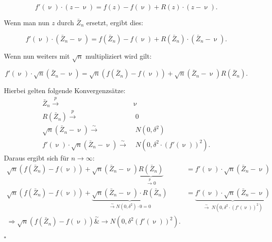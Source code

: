 \documentclass[10pt]{article}
\newcommand{\KW}{\overset{p} \longrightarrow} %
\newcommand{\KV}{\overset{\sim} \longrightarrow} %
\newenvironment{BWS}[1][]
{\begin{Beweis}[frametitle=#1]}{\end{Beweis}}
\begin{document}
\begin{BWS}[Beweis 1.3.1 Delta-Methode]
		\begin{equation*}
			f'(\upnu) \cdot (z-\upnu) = f(z) - f(\upnu) + R(z) \cdot (z-\upnu).
		\end{equation*}
		
		Wenn man nun $z$ durch $\bar{Z}_n$ ersetzt, ergibt dies:
		
		
		\begin{equation*}
			f'(\upnu) \cdot (\bar{Z}_n-\upnu) = f(\bar{Z}_n) - f(\upnu) + R(\bar{Z}_n) \cdot (\bar{Z}_n-\upnu).			
		\end{equation*}
		
		Wenn nun weiters mit $\sqrt{n}$ multipliziert wird gilt:
		
		\begin{equation*}
			f'(\upnu) \cdot\sqrt{n} (\bar{Z}_n-\upnu) = \sqrt{n}(f(\bar{Z}_n) - f(\upnu)) + \sqrt{n} (\bar{Z}_n-\upnu)	R(\bar{Z}_n).
		\end{equation*}
		
		Hierbei gelten folgende Konvergenzsätze:
		\begin{equation*}
			\begin{split}
			\bar{Z}_n \KW& \upnu\\
			R(\bar{Z}_n) \KW& \;0\\
			\sqrt{n} (\bar{Z}_n-\upnu) \KV& \;N(0,\delta^2)\\
			f'(\upnu) \cdot\sqrt{n} (\bar{Z}_n-\upnu) \KV& \;N(0,\delta^2 \cdot (f'(\upnu))^2).
			\end{split}
		\end{equation*}
		Daraus ergibt sich für $n \rightarrow \infty$: 
		\begin{equation*}
			\begin{split}
				\sqrt{n}(f(\bar{Z}_n) - f(\upnu)) + \sqrt{n} (\bar{Z}_n-\upnu)	\underbrace{R(\bar{Z}_n)}_{\overset{p}{\rightarrow} 0} &= f'(\upnu) \cdot\sqrt{n} (\bar{Z}_n-\upnu) \\
				\sqrt{n}(f(\bar{Z}_n) - f(\upnu)) + \underbrace{\sqrt{n} (\bar{Z}_n-\upnu) \cdot R(\bar{Z}_n)}_{\overset{\sim}{\rightarrow}N(0, \delta^2) \cdot 0 = 0} &= \underbrace{f'(\upnu) \cdot\sqrt{n} (\bar{Z}_n-\upnu)}_{\KV \;N(0,\delta^2 \cdot (f'(\upnu))^2)} \\
				\Longrightarrow \sqrt{n} (f(\bar{Z}_n) - f(\upnu)) \overset{\sim}&{\rightarrow} N(0, \delta^2 (f'(\upnu))^2).
			\end{split}
		\end{equation*}
		\begin{flushright}
			$\square$
		\end{flushright}
		
	\end{BWS}
	
\end{document}
